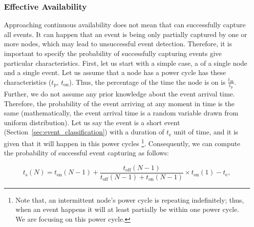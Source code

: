 \subsubsection{Effective Availability}
%
%
Approaching continuous availability does not mean that \sys can successfully capture all events.
It can happen that an event is being only partially captured by one or more nodes, which may lead to unsuccessful event detection. Therefore, it is important to specify the probability of successfully capturing  events give particular \sys characteristics.  
%
First, let us start with a simple case, a \sys of a single node and a single event. 
Let us assume that a node has a power cycle has these characteristics ($t_\text{p}$, $t_\text{on}$). Thus, the percentage of the time the node is on is $\frac{t_\text{on}}{t_\text{p}}$.
Further, we do not assume any prior knowledge about the event arrival time.
Therefore, the probability of the event arriving at any moment in time is the same 
(mathematically, the event arrival time is a random variable drawn from uniform distribution).
Let us say the event is a short event (Section~\ref{sec:event_classification}) with a duration of $t_\text{e}$ unit of time, and it is given that it will happen in this power cycles
\footnote{Note that, an intermittent node's power cycle is repeating indefinitely; thus, when an event happens it will at least partially be within one  power cycle. We are focusing on this power cycle.}.
Consequently, we can compute the probability of successful event capturing as follows:

\begin{equation}
	t_\text{s}(N) = t_\text{on}(N-1) + \frac{t_\text{off}(N-1)}{t_\text{off}(N-1)+t_\text{on}(N-1)} \times t_\text{on}(1) - t_\text{e},
		\label{eq:cisSenseModel}
\end{equation}

